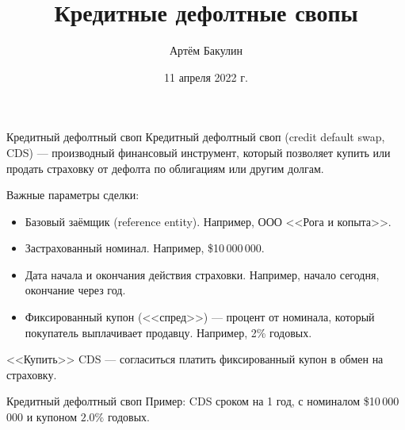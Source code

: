\documentclass{beamer}
\title{Кредитные дефолтные свопы}
\author{Артём Бакулин}
\date{11 апреля 2022 г.}
\begin{document}
\begin{frame}
\titlepage
\end{frame}

\begin{frame}{Кредитный дефолтный своп}
\justify
\alert{Кредитный дефолтный своп} (credit default swap, CDS) --- производный финансовый инструмент, который позволяет купить или продать страховку от дефолта по облигациям или другим долгам.

\justify
Важные параметры сделки:
\begin{itemize}
\justifying
\item Базовый заёмщик (reference entity). Например, ООО <<Рога и копыта>>.
\item Застрахованный номинал. Например, \$10\,000\,000.
\item Дата начала и окончания действия страховки. Например, начало сегодня, окончание через год.
\item Фиксированный купон (<<спред>>) --- процент от номинала, который покупатель выплачивает продавцу. Например, 2\% годовых.
\end{itemize}

\justify
<<Купить>> CDS --- согласиться платить фиксированный купон в обмен на страховку.
\end{frame}



\newcommand{\swapPartyNode}[5]{

	\draw (#1, #2)
		node[
			rectangle,
			draw,
			rounded corners,
			anchor = south,
			minimum height = 0.8cm,
			minimum width = 2.5cm
		]
		{#5}
	--
	(#3, #4);
}

\newcommand{\swapBuyerPaymentEx}[7]{

	\draw [
		->,
		>=triangle 90
	] 
	(#1, #2)
	node[
		label = left:{#7}
	]{}
	-- (#3, #4)
	node[
		pos=0.5,
		anchor=south
	]
	{#5}
	node[
		pos=0.5,
		anchor=north
	]
	{#6};
}

\newcommand{\swapBuyerPayment}[6]{

	\swapBuyerPaymentEx{#1}{#2}{#3}{#4}{#5}{}{#6}
}

\begin{frame}{Кредитный дефолтный своп}
\justify
Пример: CDS сроком на 1 год, с номиналом \$10\,000\,000 и купоном $2.0\%$ годовых.

\justify
\centering
{}
\end{frame}
\end{document}
